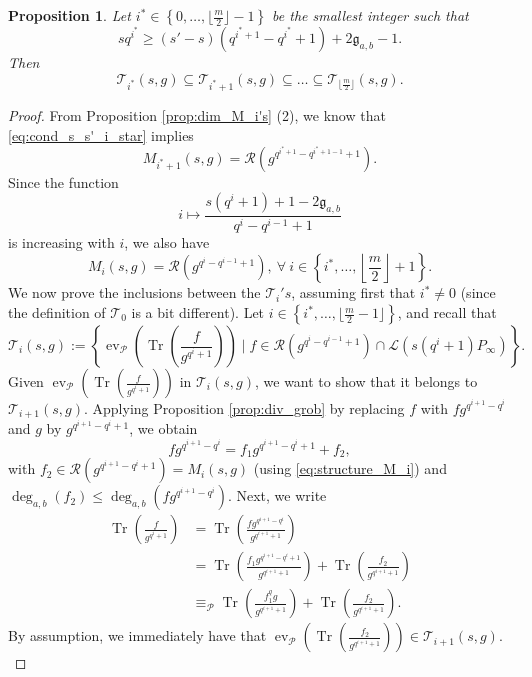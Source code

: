 \documentclass[lettersize,journal]{IEEEtran}
\theoremstyle{plain}
\newtheorem{proposition}[thm]{Proposition}
\theoremstyle{definition}
\theoremstyle{remark}
\DeclareMathOperator{\ev}{ev}
\DeclareMathOperator{\trace}{Tr}
\newcommand{\calP}{\mathcal{P}}
\newcommand{\calL}{\mathcal{L}}
\newcommand{\calR}{\mathcal{R}}
\newcommand{\calT}{\mathcal{T}}
\newcommand{\Tr}[1]{\trace\!\left(#1\right)}
\newcommand{\set}[1]{\left\{#1\right\}}
\newcommand{\degab}[1]{\deg_{a,b}\left(#1\right)}
\begin{document}
	
	\begin{proposition} \label{prop:inclusion_T_i's} Let $i^* \in \set{0,\dots,\lfloor\frac{m}{2}\rfloor-1}$ be the smallest integer such that 
		\begin{equation} \label{eq:cond_s_s'_i_star}
			sq^{i^*} \geq (s'-s)(q^{i^*+1}-q^{i^{*}}+1)+2\mathfrak{g}_{a,b}-1.
		\end{equation} 
		Then
		$$\calT_{i^*}(s,g) \subseteq \calT_{i^*+1}(s,g) \subseteq \dots \subseteq \calT_{\lfloor \frac{m}{2}\rfloor}(s,g).$$
	\end{proposition}
	\begin{proof}
		From Proposition \ref{prop:dim_M_i's} (2), we know that \eqref{eq:cond_s_s'_i_star} implies $$M_{i^*+1}(s,g) = \calR(g^{q^{i^*+1}-q^{i^*+1-1}+1}).$$ 
		Since the function $$i \mapsto \dfrac{s(q^i+1)+1-2\mathfrak{g}_{a,b}}{q^i-q^{i-1}+1}$$ 
		is increasing with $i$, we also have
		\begin{equation} \label{eq:structure_M_i}
			M_{i}(s,g) = \calR(g^{q^{i}-q^{i-1}+1}), \ \forall \ i \in \set{i^*,\dots,\left\lfloor \frac{m}{2}\right\rfloor+1}.
		\end{equation} 
		We now prove the inclusions between the $\calT_i's$, assuming first that $i^* \neq 0$ (since the definition of $\calT_0$ is a bit different). Let $i \in \set{i^*,\dots,\lfloor \frac{m}{2}-1 \rfloor}$, and recall that 
		$$\calT_i(s,g):=\set{\ev_{\calP}\left(\Tr{\frac{f}{g^{q^i+1}}}\right) \mid f \in \calR\left(g^{q^i-q^{i-1}+1}\right)  \cap \calL(s(q^i+1)P_\infty)}.$$
		Given $\ev_{\calP}\left(\Tr{\frac{f}{g^{q^i+1}}}\right)$ in $\calT_i(s,g)$, we want to show that it belongs to $\calT_{i+1}(s,g)$. Applying Proposition \ref{prop:div_grob} by replacing $f$ with $fg^{q^{i+1}-q^i}$ and $g$ by $g^{q^{i+1}-q^i+1}$, we obtain
		\begin{equation} \label{eq:division_i}
			fg^{q^{i+1}-q^i} = f_1g^{q^{i+1}-q^i+1} + f_2,
		\end{equation}
		with $f_2 \in \calR(g^{q^{i+1}-q^i+1}) = M_i(s,g)$ (using \eqref{eq:structure_M_i}) and $\degab{f_2} \leq \degab{fg^{q^{i+1}-q^i}}$. Next, we write
		\begin{align*}
			\Tr{\frac{f}{g^{q^i+1}}} &= \Tr{\frac{fg^{q^{i+1}-q^i}}{g^{q^{i+1}+1}}} \\
			&= \Tr{\frac{f_1g^{q^{i+1}-q^i+1}}{g^{q^{i+1}+1}}} + \Tr{\frac{f_2}{g^{q^{i+1}+1}}} \\
			&\equiv_{\calP} \Tr{\frac{f_1^qg}{g^{q^{i+1}+1}}} + \Tr{\frac{f_2}{g^{q^{i+1}+1}}}.
		\end{align*}
		By assumption, we immediately have that $\ev_{\calP}\left(\Tr{\frac{f_2}{g^{q^{i+1}+1}}}\right) \in \calT_{i+1}(s,g).$

\end{proof}
\end{document}
